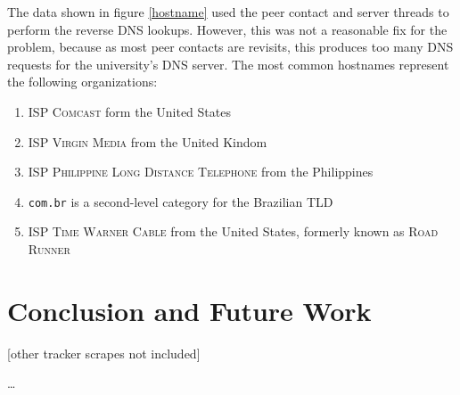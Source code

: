 \documentclass[10pt, a4paper, twoside, headsepline]{scrbook}
\renewcommand{\_}{\origunderscore\allowbreak}
\begin{document}
The data shown in figure \ref{hostname} used the peer contact and server threads to perform the reverse DNS lookups. However, this was not a reasonable fix for the problem, because as most peer contacts are revisits, this produces too many DNS requests for the university's DNS server. The most common hostnames represent the following organizations:
\begin{enumerate}
\item ISP \textsc{Comcast} form the United States
\item ISP \textsc{Virgin Media} from the United Kindom
\item ISP \textsc{Philippine Long Distance Telephone} from the Philippines
\item \texttt{com.br} is a second-level category for the Brazilian TLD
\item ISP \textsc{Time Warner Cable} from the United States, formerly known as \textsc{Road Runner}
\end{enumerate}

\chapter{Conclusion and Future Work}
[other tracker scrapes not included]

\dots

\printbibheading[heading=bibintoc]
\begingroup
\setlength{}
\printbibliography[heading=subbibintoc, title={Literature}, keyword=science]
\printbibliography[heading=subbibintoc, title={Software}, keyword=software]
\printbibliography[heading=subbibintoc, title={Online}, keyword=online]
\printbibliography[heading=subbibintoc, title={Other}, notkeyword=science, notkeyword=standard, notkeyword=software, notkeyword=online] %
\endgroup
\printbibliography[heading=subbibintoc, title={Standards}, keyword=standard]
\end{document}
